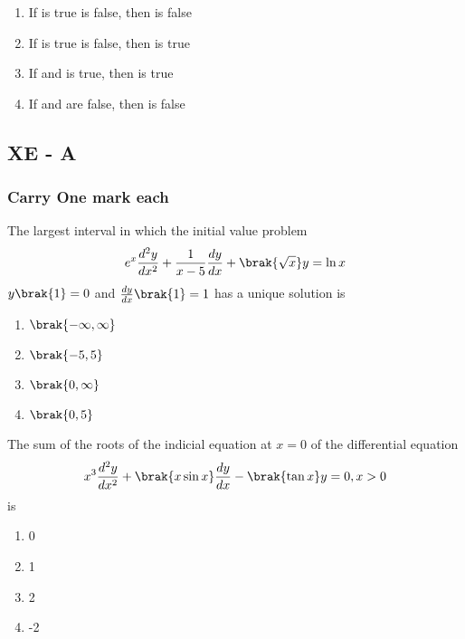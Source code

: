 	\hfill{}
	\begin{enumerate}
		\item If  is true  is false, then  is false
		\item If  is true  is false, then  is true	
		\item If  and  is true, then  is true
		\item If  and  are false, then  is false
	\end{enumerate}

\subsection{XE - A}
\subsubsection{Carry One mark each}
	\item 
	The largest interval in which the initial value problem 
	\begin{align*}
		e^x \frac{d^2y}{dx^2} + \frac{1}{x - 5}\frac{dy}{dx} + \brak{\sqrt{x}}y = \ln{x}
	\end{align*}
	$y\brak{1} = 0$ and $\frac{dy}{dx}\brak{1} = 1$ has a unique solution is 

	\hfill{}
	\begin{multicols}{4}
		\begin{enumerate}
			 \item $\brak{-\infty,\infty}$
			 \item $\brak{-5,5}$
			 \item $\brak{0,\infty}$
			 \item $\brak{0,5}$
		\end{enumerate}
	\end{multicols}

	\item 
	The sum of the roots of the indicial equation at $x = 0$ of the differential equation
	\begin{align*}
		x^3 \frac{d^2y}{dx^2} + \brak{x\sin{x}}\frac{dy}{dx} - \brak{\tan{x}}y = 0, x > 0
	\end{align*}
	is 

	\hfill{}
	\begin{multicols}{4}
		\begin{enumerate}
			\item 0
			\item 1
			\item 2
			\item -2
		\end{enumerate}
	\end{multicols}

